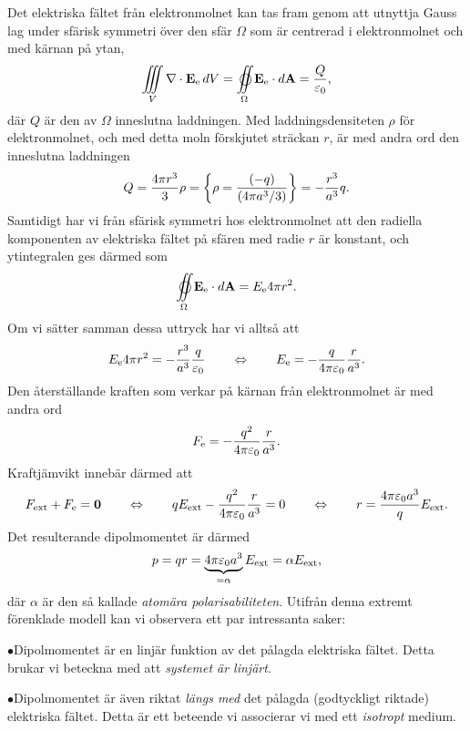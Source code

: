 Det elektriska f{\"a}ltet fr{\aa}n elektronmolnet kan tas fram genom att
utnyttja Gauss lag under sf{\"a}risk symmetri {\"o}ver den sf{\"a}r $\Omega$
som {\"a}r centrerad i elektronmolnet och med k{\"a}rnan p{\aa} ytan,
$$
  \iiint_V\nabla\cdot{\bf E}_{\rm e}\,dV
    =\oiint_{\Omega}{\bf E}_{\rm e}\cdot d{\bf A}
    ={{Q}\over{\varepsilon_0}},
$$
d{\"a}r $Q$ {\"a}r den av $\Omega$ inneslutna laddningen.
Med laddningsdensiteten $\rho$ f{\"o}r elektronmolnet, och med detta moln
f{\"o}rskjutet str{\"a}ckan $r$, {\"a}r med andra ord den inneslutna laddningen
$$
  Q={{4\pi r^3}\over{3}}\rho
   =\bigg\{\rho={{(-q)}\over{(4\pi a^3/3)}}\bigg\}
   =-{{r^3}\over{a^3}}q.
$$
Samtidigt har vi fr{\aa}n sf{\"a}risk symmetri hos elektronmolnet att den
radiella komponenten av elektriska f{\"a}ltet p{\aa} sf{\"a}ren med radie
$r$ {\"a}r konstant, och ytintegralen ges d{\"a}rmed som
$$
  \oiint_{\Omega}{\bf E}_{\rm e}\cdot d{\bf A} =E_{\rm e}4\pi r^2.
$$
Om vi s{\"a}tter samman dessa uttryck har vi allts{\aa} att
$$
  E_{\rm e}4\pi r^2 = -{{r^3}\over{a^3}}{{q}\over{\varepsilon_0}}
  \qquad\Leftrightarrow\qquad
  E_{\rm e} = -{{q}\over{4\pi\varepsilon_0}}{{r}\over{a^3}}.
$$
Den {\aa}terst{\"a}llande kraften som verkar p{\aa} k{\"a}rnan fr{\aa}n
elektronmolnet {\"a}r med andra ord
$$
  F_{\rm e} = -{{q^2}\over{4\pi\varepsilon_0}}{{r}\over{a^3}}.
$$
Kraftj{\"a}mvikt inneb{\"a}r d{\"a}rmed att
$$
  F_{\rm ext}+F_{\rm e} = {\bf 0}
  \qquad\Leftrightarrow\qquad
  qE_{\rm ext}-{{q^2}\over{4\pi\varepsilon_0}}{{r}\over{a^3}} = 0
  \qquad\Leftrightarrow\qquad
  r = {{4\pi\varepsilon_0 a^3}\over{q}} E_{\rm ext}.
$$
Det resulterande dipolmomentet {\"a}r d{\"a}rmed
$$
  p = qr
    = \underbrace{4\pi\varepsilon_0 a^3}_{=\alpha} E_{\rm ext}
    = \alpha E_{\rm ext},
$$
d{\"a}r $\alpha$ {\"a}r den s{\aa} kallade {\it atom{\"a}ra
polarisabiliteten}.
Utifr{\aa}n denna extremt f{\"o}renklade modell kan vi observera ett par
intressanta saker:
\medskip
\item{$\bullet$}{Dipolmomentet {\"a}r en linj{\"a}r funktion av det
                 p{\aa}lagda elektriska f{\"a}ltet. Detta brukar vi beteckna
                 med att {\it systemet {\"a}r linj{\"a}rt}.}
\item{$\bullet$}{Dipolmomentet {\"a}r {\"a}ven riktat {\it l{\"a}ngs med} det
                 p{\aa}lagda (godtyckligt riktade) elektriska f{\"a}ltet.
                 Detta {\"a}r ett beteende vi associerar vi med ett
                 {\it isotropt} medium.}
